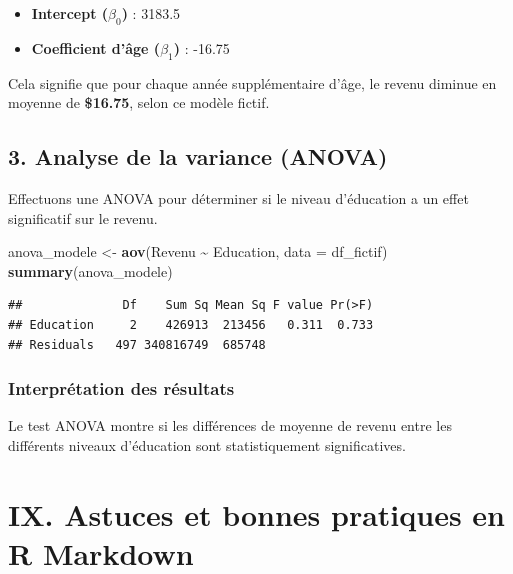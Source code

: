 \documentclass[
]{article}
\newenvironment{Shaded}{\begin{snugshade}}{\end{snugshade}}
\newcommand{\AttributeTok}[1]{\textcolor[rgb]{0.13,0.29,0.53}{#1}}
\newcommand{\FunctionTok}[1]{\textcolor[rgb]{0.13,0.29,0.53}{\textbf{#1}}}
\newcommand{\NormalTok}[1]{#1}
\newcommand{\OtherTok}[1]{\textcolor[rgb]{0.56,0.35,0.01}{#1}}
\newcommand{\SpecialCharTok}[1]{\textcolor[rgb]{0.81,0.36,0.00}{\textbf{#1}}}
\providecommand{\tightlist}{%
  \setlength{\itemsep}{0pt}\setlength{\parskip}{0pt}}
\begin{document}
\begin{itemize}
\tightlist
\item
  \textbf{Intercept (\(\beta_0\))} : 3183.5
\item
  \textbf{Coefficient d'âge (\(\beta_1\))} : -16.75
\end{itemize}

Cela signifie que pour chaque année supplémentaire d'âge, le revenu
diminue en moyenne de \textbf{\$16.75}, selon ce modèle fictif.

\hypertarget{analyse-de-la-variance-anova}{%
\subsection{3. Analyse de la variance
(ANOVA)}\label{analyse-de-la-variance-anova}}

Effectuons une ANOVA pour déterminer si le niveau d'éducation a un effet
significatif sur le revenu.

\begin{Shaded}
\begin{Highlighting}[]
\NormalTok{anova\_modele }\OtherTok{\textless{}{-}} \FunctionTok{aov}\NormalTok{(Revenu }\SpecialCharTok{\textasciitilde{}}\NormalTok{ Education, }\AttributeTok{data =}\NormalTok{ df\_fictif)}
\FunctionTok{summary}\NormalTok{(anova\_modele)}
\end{Highlighting}
\end{Shaded}

\begin{verbatim}
##              Df    Sum Sq Mean Sq F value Pr(>F)
## Education     2    426913  213456   0.311  0.733
## Residuals   497 340816749  685748
\end{verbatim}

\hypertarget{interpruxe9tation-des-ruxe9sultats-1}{%
\subsubsection{Interprétation des
résultats}\label{interpruxe9tation-des-ruxe9sultats-1}}

Le test ANOVA montre si les différences de moyenne de revenu entre les
différents niveaux d'éducation sont statistiquement significatives.

\hypertarget{ix.-astuces-et-bonnes-pratiques-en-r-markdown}{%
\section{IX. Astuces et bonnes pratiques en R
Markdown}\label{ix.-astuces-et-bonnes-pratiques-en-r-markdown}}
\end{document}
